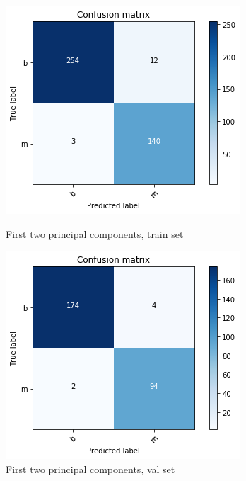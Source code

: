 \documentclass[11pt,a4paper]{article}
\begin{document}
\begin{enumerate}
\begin{enumerate}
		\begin{figure}[H]\centering
			\begin{minipage}{0.49\linewidth}
				\includegraphics[width=\linewidth]{figures/conf_train_pca_123.png}
				\caption{First two principal components, train set}\label{fig:conf_train_pca_123.png}
			\end{minipage}
			\begin{minipage}{0.49\linewidth}
				\includegraphics[width=\linewidth]{figures/conf_val_pca_123.png}
				\caption{First two principal components, val set}\label{fig:conf_val_pca_123.png}
			\end{minipage}
		\end{figure}	
		

\end{enumerate}
\end{enumerate}
\end{document}
